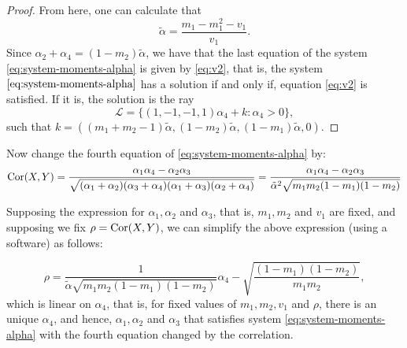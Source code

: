 \begin{proof}
From here, one can calculate that
$$
\tilde{\alpha} = \frac{m_1 - m_1^2 - v_1}{v_1}.
$$
Since $\alpha_2 + \alpha_4 = (1 - m_2)\tilde{\alpha}$, we have that the last
equation of the system \eqref{eq:system-moments-alpha} is given by
\eqref{eq:v2}, that is, the system $\eqref{eq:system-moments-alpha}$ has a solution if and
only if, equation \eqref{eq:v2} is satisfied. If it is, the solution is the ray 
$$
\mathcal{L} = \{(1,-1,-1,1)\alpha_4 + k : \alpha_4 > 0\}, 
$$
such that $k = \left((m_1 + m_2 - 1)\tilde{\alpha}, (1-m_2)\tilde{\alpha},
(1-m_1)\tilde{\alpha}, 0\right)$. 

\end{proof}


Now change the fourth equation of \eqref{eq:system-moments-alpha} by: 
$$
\operatorname{Cor}(X,Y) = \frac{\alpha_1\alpha_4 - \alpha_2\alpha_3}{\sqrt{(\alpha_1+\alpha_2)(\alpha_3+\alpha_4)(\alpha_1+\alpha_3)(\alpha_2+\alpha_4)}} = \frac{\alpha_1\alpha_4 - \alpha_2\alpha_3}{\tilde{\alpha}^2\sqrt{m_1m_2(1-m_1)(1-m_2)}}
$$

Supposing the expression for $\alpha_1, \alpha_2$ and $\alpha_3$, that is,
$m_1, m_2$ and $v_1$ are fixed, and supposing we fix $\rho = \operatorname{Cor}(X,Y)$, we
can simplify the above expression (using a software) as follows: 

$$
\rho = \frac{1}{\tilde{\alpha}\sqrt{m_1m_2(1-m_1)(1-m_2)}}\alpha_4 - \sqrt{\frac{(1 - m_1)(1 - m_2)}{m_1m_2}},
$$
which is linear on $\alpha_4$, that is, for fixed values of
$m_1, m_2, v_1$ and $\rho$, there is an unique $\alpha_4$, and hence,
$\alpha_1, \alpha_2$ and $\alpha_3$ that satisfies system
\eqref{eq:system-moments-alpha} with the fourth equation changed by the
correlation. 